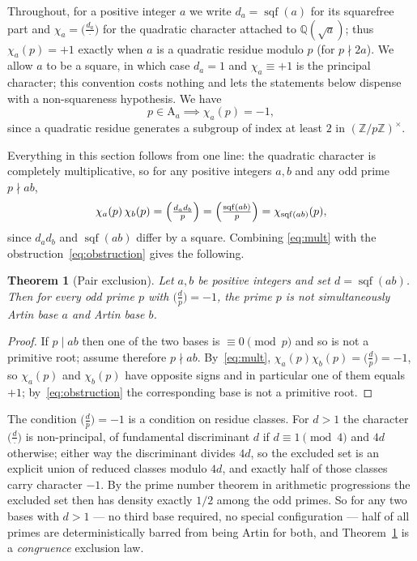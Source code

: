 \documentclass[11pt,reqno]{amsart}
\theoremstyle{plain}
\newtheorem{theorem}{Theorem}
\theoremstyle{definition}
\DeclareMathOperator{\sqf}{sqf}
\newcommand{\Art}{\mathrm{A}}
\newcommand{\Z}{\mathbb{Z}}
\newcommand{\Q}{\mathbb{Q}}
\begin{document}
Throughout, for a positive integer $a$ we write $d_a = \sqf(a)$
for its squarefree part and $\chi_a = \bigl(\tfrac{d_a}{\cdot}\bigr)$ for the
quadratic character attached to $\Q(\sqrt{a})$; thus $\chi_a(p) = +1$ exactly
when $a$ is a quadratic residue modulo $p$ (for $p \nmid 2a$). We allow $a$ to
be a square, in which case $d_a = 1$ and $\chi_a \equiv +1$ is the principal
character; this convention costs nothing and lets the statements below dispense
with a non-squareness hypothesis. We have
\begin{equation}
\label{eq:obstruction}
  p \in \Art_a \implies \chi_a(p) = -1,
\end{equation}
since a quadratic residue generates a subgroup of index at least $2$ in
$(\Z/p\Z)^\times$.

Everything in this section follows from one line: the quadratic character is
completely multiplicative, so for any positive integers $a, b$ and any odd
prime $p \nmid ab$,
\begin{equation}
\label{eq:mult}
  \chi_a(p)\,\chi_b(p)
    = \Bigl(\tfrac{d_a d_b}{p}\Bigr)
    = \Bigl(\tfrac{\sqf(ab)}{p}\Bigr)
    = \chi_{\sqf(ab)}(p),
\end{equation}
since $d_a d_b$ and $\sqf(ab)$ differ by a square. Combining
\eqref{eq:mult} with the obstruction~\eqref{eq:obstruction} gives the
following.

\begin{theorem}[Pair exclusion]
\label{thm:pair}
Let $a, b$ be positive integers and set $d = \sqf(ab)$. Then for every odd
prime $p$ with $\bigl(\tfrac{d}{p}\bigr) = -1$, the prime $p$ is not
simultaneously Artin base $a$ and Artin base $b$.
\end{theorem}

\begin{proof}
If $p \mid ab$ then one of the two bases is $\equiv 0 \pmod p$ and so is not a
primitive root; assume therefore $p \nmid ab$. By~\eqref{eq:mult},
$\chi_a(p)\chi_b(p) = \bigl(\tfrac{d}{p}\bigr) = -1$, so $\chi_a(p)$ and
$\chi_b(p)$ have opposite signs and in particular one of them equals $+1$;
by~\eqref{eq:obstruction} the corresponding base is not a primitive root.
\end{proof}

The condition $\bigl(\tfrac{d}{p}\bigr) = -1$ is a condition on residue
classes. For $d > 1$ the character $\bigl(\tfrac{d}{\cdot}\bigr)$ is
non-principal, of fundamental discriminant $d$ if $d \equiv 1 \pmod 4$ and
$4d$ otherwise; either way the discriminant divides $4d$, so the excluded set
is an explicit union of reduced classes modulo $4d$, and exactly half of those
classes carry character $-1$. By the prime number theorem in arithmetic
progressions the excluded set then has density exactly $1/2$ among the odd
primes. So for any two bases with $d > 1$ --- no third base required, no
special configuration --- half of all primes are deterministically barred from
being Artin for both, and Theorem~\ref{thm:pair} is a \emph{congruence}
exclusion law.
\end{document}
